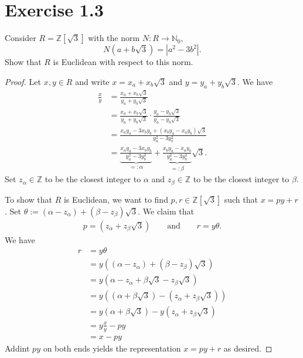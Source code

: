 \documentclass[a4paper]{article}
\begin{document}
\section*{Exercise 1.3}
Consider \(R = \mathbb{Z}[\sqrt{3}]\) with the norm \(N: R \longrightarrow \mathbb{N}_0\),
\begin{equation*}
  N(a + b\sqrt{3}) = |a^2 - 3b^2| \text{.}
\end{equation*}
Show that \(R\) is Euclidean with respect to this norm.
\begin{proof}
  Let \(x, y \in R\) and write \(x = x_a + x_b \sqrt{3}\) and \(y = y_a + y_b \sqrt{3}\). We have
  \begin{align*}
    \frac{x}{y} &= \frac{x_a + x_b \sqrt{3}}{y_a + y_b \sqrt{3}} \\
    &= \frac{x_a + x_b \sqrt{3}}{y_a + y_b \sqrt{3}} \cdot \frac{y_a - y_b \sqrt{3}}{y_a - y_b \sqrt{3}} \\
    &= \frac{x_a y_a - 3x_b y_b + (x_b y_a - x_a y_b) \sqrt{3}}{y^2_a - 3y_b^2} \\
    &= \underbrace{\frac{x_a y_a - 3x_b y_b}{y^2_a - 3y_b^2}}_{=: \alpha} + \underbrace{\frac{x_b y_a - x_a y_b}{y^2_a - 3y_b^2}}_{=: \beta} \sqrt{3} \text{.}
  \end{align*}
  Set \(z_\alpha \in \mathbb{Z}\) to be the closest integer to \(\alpha\) and \(z_\beta \in \mathbb{Z}\) to be the closest integer to \(\beta\).

  To show that \(R\) is Euclidean, we want to find \(p, r \in \mathbb{Z}[\sqrt{3}]\) such that \(x = p y + r\). Set \(\theta := (\alpha - z_\alpha) + (\beta - z_\beta)\sqrt{3}\). We claim that
  \begin{align*}
    p = (z_\alpha + z_\beta \sqrt{3}) \qquad \text{and} \qquad r = y \theta \text{.}
  \end{align*}
  We have
  \begin{align*}
    r &= y \theta \\
    &= y ((\alpha - z_\alpha) + (\beta - z_\beta) \sqrt{3}) \\
    &= y (\alpha - z_\alpha + \beta \sqrt{3} - z_\beta \sqrt{3}) \\
    &= y ((\alpha + \beta \sqrt{3}) - (z_\alpha + z_\beta \sqrt{3})) \\
    &=  y(\alpha + \beta \sqrt{3}) - y(z_\alpha + z_\beta \sqrt{3}) \\
    &= y \frac{x}{y} - py \\
    &= x - py
  \end{align*}
  Addint \(py\) on both ends yields the representation \(x = py + r\) as desired.


\end{proof}
\end{document}
